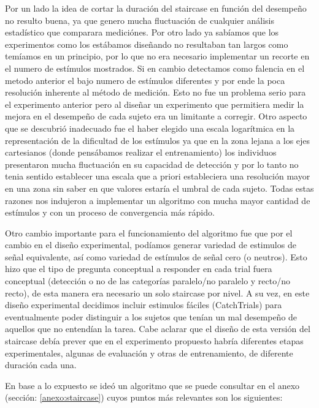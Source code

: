 \documentclass{article}
\begin{document}
    Por un lado la idea de cortar la duración del staircase en función del desempeño no resulto buena, ya que genero mucha fluctuación de cualquier análisis estadístico que comparara mediciónes. Por otro lado ya sabíamos que los experimentos como los estábamos diseñando no resultaban tan largos como temíamos en un principio, por lo que no era necesario implementar un recorte en el numero de estímulos mostrados. Si en cambio detectamos como falencia en el metodo anterior el bajo numero de estímulos diferentes y por ende la poca resolución inherente al método de medición. Esto no fue un problema serio para el experimento anterior pero al diseñar un experimento que permitiera medir la mejora en el desempeño de cada sujeto era un limitante a corregir. Otro aspecto que se descubrió inadecuado fue el haber elegido una escala logarítmica en la representación de la dificultad de los estímulos ya que en la zona lejana a los ejes cartesianos (donde pensábamos realizar el entrenamiento) los individuos presentaron mucha fluctuación en su capacidad de detección y por lo tanto no tenia sentido establecer una escala que a priori estableciera una resolución mayor en una zona sin saber en que valores estaría el umbral de cada sujeto. Todas estas razones nos indujeron a implementar un algoritmo con mucha mayor cantidad de estímulos y con un proceso de convergencia más rápido. 
    
    Otro cambio importante para el funcionamiento del algoritmo fue que por el cambio en el diseño experimental, podíamos generar variedad de estimulos de señal equivalente, así como variedad de estímulos de señal cero (o neutros). Esto hizo que el tipo de pregunta conceptual a responder en cada trial fuera conceptual (detección o no de las categorías paralelo/no paralelo y recto/no recto), de esta manera era necesario un solo staircase por nivel. A su vez, en este diseño experimental decidimos incluir estimulos fáciles (CatchTrials) para eventualmente poder distinguir a los sujetos que tenían un mal desempeño de aquellos que no entendían la tarea. Cabe aclarar que el diseño de esta versión del staircase debía prever que en el experimento propuesto habría diferentes etapas experimentales, algunas de evaluación y otras de entrenamiento, de diferente duración cada una.
    
    En base a lo expuesto se ideó un algoritmo que se puede consultar en el anexo (sección:  \ref{anexo:staircase}) cuyos puntos más relevantes son los siguientes:
    
\end{document}
